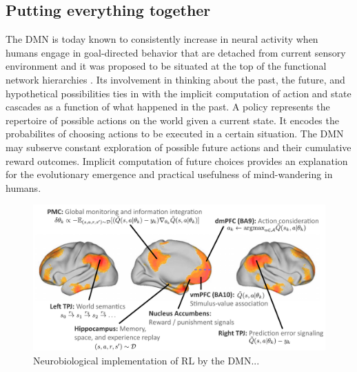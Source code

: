 \documentclass[10pt,letterpaper]{article}
\begin{document}
\subsection{Putting everything together}
The DMN is today known to consistently increase in neural
  activity when humans engage in goal-directed behavior that are detached from
  current sensory environment \citep{kenet2003spontaneously, fiser2004small}
  and it was proposed to be situated at the top of the functional network hierarchies
  \citep{carhart2010default, margulies2016situating}.
  Its involvement in thinking about the past,
  the future, and hypothetical possibilities ties in with the implicit computation of
  action and state cascades as a function of what happened in the past.
  A policy represents the repertoire of possible actions
    on the world given a current state. It encodes the probabilites of
    choosing actions to be executed in a certain situation.
The DMN may subserve
  constant exploration of possible future actions and their
  cumulative reward outcomes. Implicit computation of future choices
  provides an explanation for the
  evolutionary emergence and practical usefulness of mind-wandering
  in humans.    
\begin{figure}[!h]
  \includegraphics[width=.9\linewidth]{neurobiological_and_rl_overview_DMN.pdf}
  \caption{Neurobiological implementation of RL by the DMN...}
  \label{fig:rl_process_chart}
\end{figure}
    
\end{document}
